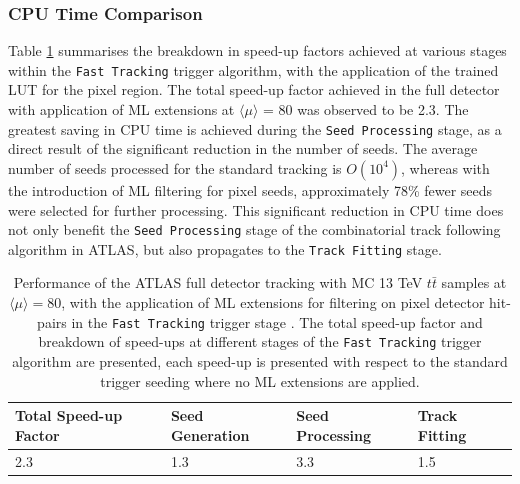 \subsubsection{CPU Time Comparison}


Table \ref{tab:cpu} summarises the breakdown in speed-up factors achieved at various stages within the \texttt{Fast Tracking} trigger algorithm, with the application of the trained LUT for the pixel region. The total speed-up factor achieved in the full detector with application of ML extensions at $\langle \mu \rangle$ = 80 was observed to be 2.3. The greatest saving in CPU time is achieved during the \texttt{Seed Processing} stage, as a direct result of the significant reduction in the number of seeds. The average number of seeds processed for the standard tracking is $O(10^{4})$, whereas with the introduction of ML filtering for pixel seeds, approximately 78\% fewer seeds were selected for further processing. This significant reduction in CPU time does not only benefit the \texttt{Seed Processing} stage of the combinatorial track following algorithm in ATLAS, but also propagates to the \texttt{Track Fitting} stage.

\begin{table}[!htbp]
\caption{Performance of the ATLAS full detector tracking with MC 13 TeV $t\bar{t}$ samples at $\langle \mu \rangle = 80$, with the application of ML extensions for filtering on pixel detector hit-pairs in the \texttt{Fast Tracking} trigger stage \cite{public-hlt}. The total speed-up factor and breakdown of speed-ups at different stages of the \texttt{Fast Tracking} trigger algorithm are presented, each speed-up is presented with respect to the standard trigger seeding where no ML extensions are applied.}
\begin{center}
\begin{tabular}{llll}
\toprule
Total Speed-up Factor & Seed Generation & Seed Processing & Track Fitting \\
\hline
2.3 & 1.3 & 3.3 & 1.5 \\ 
\bottomrule
\end{tabular}
\end{center}
\label{tab:cpu}
\end{table}

